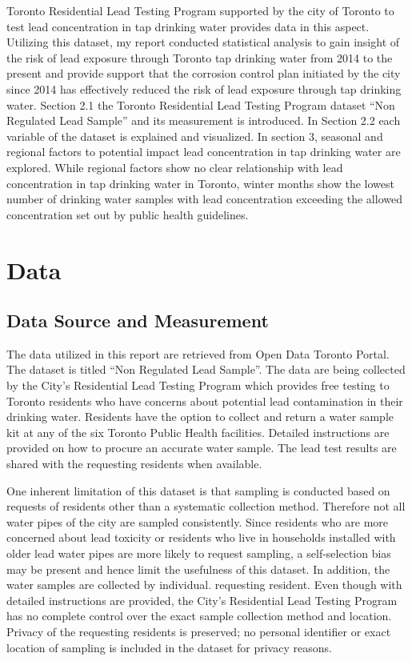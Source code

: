 \documentclass[
  letterpaper,
  DIV=11,
  numbers=noendperiod]{scrartcl}
\begin{document}
Toronto Residential Lead Testing Program supported by the city of
Toronto to test lead concentration in tap drinking water provides data
in this aspect. Utilizing this dataset, my report conducted statistical
analysis to gain insight of the risk of lead exposure through Toronto
tap drinking water from 2014 to the present and provide support that the
corrosion control plan initiated by the city since 2014 has effectively
reduced the risk of lead exposure through tap drinking water. Section
2.1 the Toronto Residential Lead Testing Program dataset ``Non Regulated
Lead Sample'' and its measurement is introduced. In Section 2.2 each
variable of the dataset is explained and visualized. In section 3,
seasonal and regional factors to potential impact lead concentration in
tap drinking water are explored. While regional factors show no clear
relationship with lead concentration in tap drinking water in Toronto,
winter months show the lowest number of drinking water samples with lead
concentration exceeding the allowed concentration set out by public
health guidelines.

\hypertarget{sec-data}{%
\section{Data}\label{sec-data}}

\hypertarget{sec-datasource}{%
\subsection{Data Source and Measurement}\label{sec-datasource}}

The data utilized in this report are retrieved from Open Data Toronto
Portal. The dataset is titled ``Non Regulated Lead Sample''. The data
are being collected by the City's Residential Lead Testing Program which
provides free testing to Toronto residents who have concerns about
potential lead contamination in their drinking water. Residents have the
option to collect and return a water sample kit at any of the six
Toronto Public Health facilities. Detailed instructions are provided on
how to procure an accurate water sample. The lead test results are
shared with the requesting residents when available.

One inherent limitation of this dataset is that sampling is conducted
based on requests of residents other than a systematic collection
method. Therefore not all water pipes of the city are sampled
consistently. Since residents who are more concerned about lead toxicity
or residents who live in households installed with older lead water
pipes are more likely to request sampling, a self-selection bias may be
present and hence limit the usefulness of this dataset. In addition, the
water samples are collected by individual. requesting resident. Even
though with detailed instructions are provided, the City's Residential
Lead Testing Program has no complete control over the exact sample
collection method and location. Privacy of the requesting residents is
preserved; no personal identifier or exact location of sampling is
included in the dataset for privacy reasons.
\end{document}

